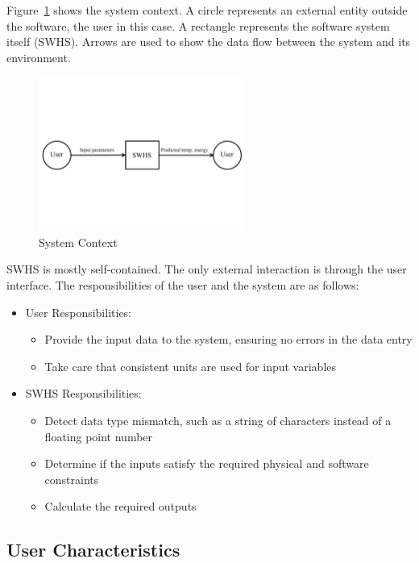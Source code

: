 \documentclass[12pt]{article}
\newcommand{\progname}{SWHS}
\begin{document}
Figure~\ref{Fig_SystemContext} shows the system context.  A circle represents an
external entity outside the software, the user in this case.  A rectangle
represents the software system itself (\progname{}).  Arrows are used to show the data
flow between the system and its environment.

\begin{figure}[h!]
\begin{center}
 \includegraphics[width=0.6\textwidth]{SystemContextFigure}
\caption{System Context}
\label{Fig_SystemContext} 
\end{center}
\end{figure}

\progname{} is mostly self-contained.  The only external interaction is through
the user interface.  The responsibilities of the user and the system are as
follows:

\begin{itemize}
\item User Responsibilities:
\begin{itemize}
\item Provide the input data to the system, ensuring no errors in the data entry
\item Take care that consistent units are used for input variables
\end{itemize}
\item \progname{} Responsibilities:
\begin{itemize}
\item Detect data type mismatch, such as a string of characters instead of a
  floating point number
\item Determine if the inputs satisfy the required physical and software constraints
\item Calculate the required outputs
\end{itemize}
\end{itemize}

\subsection{User Characteristics}\label{Sec:UserChar}
\end{document}

